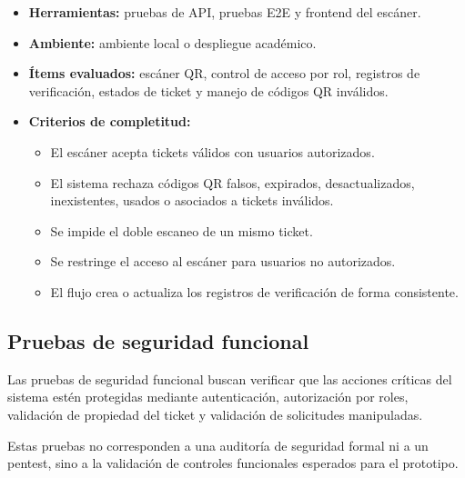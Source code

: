 \documentclass[12pt,letterpaper]{article}
\begin{document}
\begin{itemize}
    \item \textbf{Herramientas:} pruebas de API, pruebas E2E y frontend del escáner.
    \item \textbf{Ambiente:} ambiente local o despliegue académico.
    \item \textbf{Ítems evaluados:} escáner QR, control de acceso por rol, registros de verificación, estados de ticket y manejo de códigos QR inválidos.
    \item \textbf{Criterios de completitud:}
    \begin{itemize}
        \item El escáner acepta tickets válidos con usuarios autorizados.
        \item El sistema rechaza códigos QR falsos, expirados, desactualizados, inexistentes, usados o asociados a tickets inválidos.
        \item Se impide el doble escaneo de un mismo ticket.
        \item Se restringe el acceso al escáner para usuarios no autorizados.
        \item El flujo crea o actualiza los registros de verificación de forma consistente.
    \end{itemize}
\end{itemize}

\subsection{Pruebas de seguridad funcional}

Las pruebas de seguridad funcional buscan verificar que las acciones críticas del sistema estén protegidas mediante autenticación, autorización por roles, validación de propiedad del ticket y validación de solicitudes manipuladas.

Estas pruebas no corresponden a una auditoría de seguridad formal ni a un pentest, sino a la validación de controles funcionales esperados para el prototipo.
\end{document}
